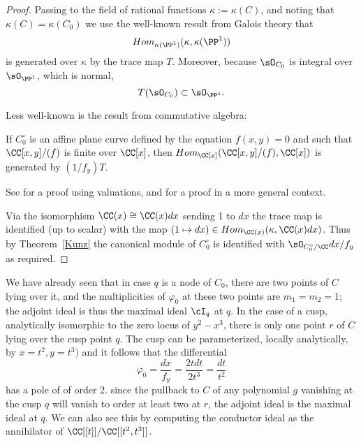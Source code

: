 \begin{proof}
Passing to the field of rational functions $\kappa := \kappa(C)$, and noting that
$\kappa(C) = \kappa(C_{0}) $ we use the well-known result from Galois theory that 
$$
Hom_{\kappa(\PP^{1})}(\kappa, \kappa(\PP^{1}))
$$
is generated over $\kappa$ by the trace map $T$. Moreover, 
because $\sO_{C_{0}}$ is integral over $\sO_{\PP^{1}}$, which is normal,
$$
T(\sO_{C_{0}})\subset \sO_{\PP^{1}}.
$$

Less well-known is the result from commutative
algebra:
\begin{fact}
\begin{theorem}\label{Kunz}
If $C_{0}^{\circ}$ is an affine plane curve defined by the
equation $f(x,y)=0$ and such that $\CC[x,y]/(f)$ is finite over $\CC[x]$,
then $Hom_{\CC[x]}(\CC[x,y]/(f), \CC[x])$ is generated by $(1/f_{y})T$.
\end{theorem}
See \cite[Theorem 15.1]{Kunz} for a proof using valuations, and \cite[Theorem A.1]{MR4026452} for a proof in
a more general context.
\end{fact}

Via the isomorphism $\CC(x) \cong \CC(x)dx$ sending 1 to $dx$ the trace map is identified (up to scalar)
with the map $(1\mapsto dx) \in Hom_{\CC(x)}(\kappa, \CC(x)dx)$. Thus by Theorem~\ref{Kunz}
the canonical module of $C_{0}^{\circ}$ is identified with $\sO_{C_{0}^{\circ}/\CC} dx/f_{y}$ as
required.
\end{proof}




\begin{example}
We have already seen that in case $q$ is a node of $C_0$, there are two points of $C$ lying over it, and the multiplicities of $\varphi_0$ at these two points are $m_1=m_2=1$; the adjoint ideal is thus 
 the maximal ideal $\cI_q$ at $q$. In the case of a cusp, analytically isomorphic to the zero locus of $y^2-x^3$, there is only one point $r$ of $C$ lying over the cusp point $q$. The cusp can be parameterized, locally analytically,
 by $x = t^{2}, y = t^{3})$ and it follows that the differential 
 $$
 \varphi_0 = \frac{dx}{f_{y}} =  \frac{2tdt}{2t^{3}} =  \frac{dt}{t^{2}}
 $$ 
 has a pole of of order 2. since the pullback to $C$ of any polynomial $g$ vanishing at the cusp $q$ will vanish to order at least two at $r$, the adjoint ideal is the maximal ideal at $q$. We can also see this by computing the
 conductor ideal as the annihilator of $\CC[[t]]/\CC[[t^{2}, t^{3}]]$.
\end{example}

